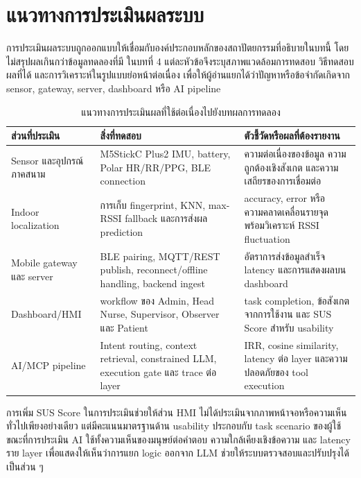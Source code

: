 \section{แนวทางการประเมินผลระบบ}
\label{sec:ch3_evaluation_plan}
การประเมินผลระบบถูกออกแบบให้เชื่อมกับองค์ประกอบหลักของสถาปัตยกรรมที่อธิบายในบทนี้ โดยไม่สรุปผลเกินกว่าข้อมูลทดลองที่มี ในบทที่ 4 แต่ละหัวข้อจึงระบุสภาพแวดล้อมการทดสอบ วิธีทดสอบ ผลที่ได้ และการวิเคราะห์ในรูปแบบย่อหน้าต่อเนื่อง เพื่อให้ผู้อ่านแยกได้ว่าปัญหาหรือข้อจำกัดเกิดจาก sensor, gateway, server, dashboard หรือ AI pipeline

\begin{table}[H]
    \centering
    \caption{แนวทางการประเมินผลที่ใช้ต่อเนื่องไปยังบทผลการทดลอง}
    \label{tab:ch3_evaluation_plan}
    \small
    \renewcommand{\arraystretch}{1.22}
    \begin{tabular}{|L{3.4cm}|L{4.8cm}|L{4.5cm}|}
        \hline
        \textbf{ส่วนที่ประเมิน} & \textbf{สิ่งที่ทดสอบ} & \textbf{ตัวชี้วัดหรือผลที่ต้องรายงาน} \\ \hline
        Sensor และอุปกรณ์ภาคสนาม & M5StickC Plus2 IMU, battery, Polar HR/RR/PPG, BLE connection & ความต่อเนื่องของข้อมูล ความถูกต้องเชิงสังเกต และความเสถียรของการเชื่อมต่อ \\ \hline
        Indoor localization & การเก็บ fingerprint, KNN, max-RSSI fallback และการส่งผล prediction & accuracy, error หรือความคลาดเคลื่อนรายจุด พร้อมวิเคราะห์ RSSI fluctuation \\ \hline
        Mobile gateway และ server & BLE pairing, MQTT/REST publish, reconnect/offline handling, backend ingest & อัตราการส่งข้อมูลสำเร็จ latency และการแสดงผลบน dashboard \\ \hline
        Dashboard/HMI & workflow ของ Admin, Head Nurse, Supervisor, Observer และ Patient & task completion, ข้อสังเกตจากการใช้งาน และ SUS Score สำหรับ usability \\ \hline
        AI/MCP pipeline & Intent routing, context retrieval, constrained LLM, execution gate และ trace ต่อ layer & IRR, cosine similarity, latency ต่อ layer และความปลอดภัยของ tool execution \\ \hline
    \end{tabular}
\end{table}

การเพิ่ม SUS Score ในการประเมินช่วยให้ส่วน HMI ไม่ได้ประเมินจากภาพหน้าจอหรือความเห็นทั่วไปเพียงอย่างเดียว แต่มีคะแนนมาตรฐานด้าน usability ประกอบกับ task scenario ของผู้ใช้ ขณะที่การประเมิน AI ใช้ทั้งความเห็นของมนุษย์ต่อคำตอบ ความใกล้เคียงเชิงข้อความ และ latency ราย layer เพื่อแสดงให้เห็นว่าการแยก logic ออกจาก LLM ช่วยให้ระบบตรวจสอบและปรับปรุงได้เป็นส่วน ๆ
